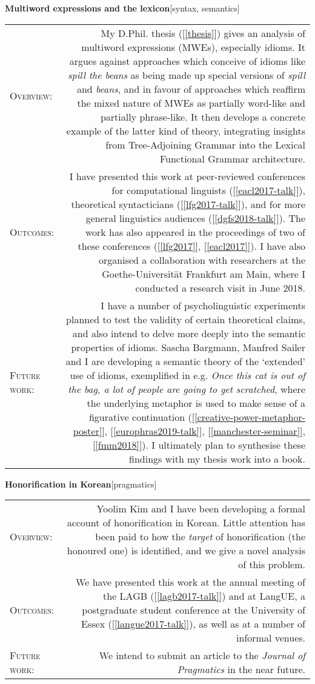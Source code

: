 \documentclass[11pt,a4paper]{article}
\makeatletter
\newlength{\rulelength}%
\newcommand{\REx}[2]{%
\vspace*{0.1\baselineskip}%
{\large\textbf{#1}\hfill\textnormal{[#2]}}%
\vspace*{0.5\baselineskip}%
}
\newenvironment{cvsection}{%
  \setlength{\extrarowheight}{0.70ex}
  \begin{longtable}[l]{@{} L R @{}}
}{%
  \end{longtable}
}
\newcommand{\sref}[1]{[\ref{#1}]}
\newcommand{\subhead}[1]{%
\textsc{#1}:%
}
\makeatother
\begin{document}
\REx{Multiword expressions and the lexicon}{syntax, semantics}
\begin{cvsection}
  \subhead{Overview} &%
  My D.Phil. thesis (\sref{thesis}) gives an analysis of multiword expressions (MWEs), especially idioms. It argues against approaches which conceive of idioms like \emph{spill the beans} as being made up special versions of \emph{spill} and \emph{beans}, and in favour of approaches which reaffirm the mixed nature of MWEs as partially word-like and partially phrase-like. It then develops a concrete example of the latter kind of theory, integrating insights from Tree-Adjoining Grammar into the Lexical Functional Grammar architecture.%
\\
  \subhead{Outcomes} &%
  I have presented this work at peer-reviewed conferences for computational linguists (\sref{eacl2017-talk}), theoretical syntacticians (\sref{lfg2017-talk}), and for more general linguistics audiences (\sref{dgfs2018-talk}). The work has also appeared in the proceedings of two of these conferences (\sref{lfg2017}, \sref{eacl2017}).
  I have also organised a collaboration with researchers at the Goethe-Universit\"{a}t Frankfurt am Main, where I conducted a research visit in June 2018.
\\
  \subhead{Future work} &%
  I have a number of psycholinguistic experiments planned to test the validity of certain theoretical claims, and also intend to delve more deeply into the semantic properties of idioms. Sascha Bargmann, Manfred Sailer and I are developing a semantic theory of the `extended' use of idioms, exemplified in e.g. \textit{Once this cat is out of the bag, a lot of people are going to get scratched}, where the underlying metaphor is used to make sense of a figurative continuation (\sref{creative-power-metaphor-poster}, \sref{europhras2019-talk}, \sref{manchester-seminar}, \sref{fmm2018}). I ultimately plan to synthesise these findings with my thesis work into a book.
\end{cvsection}

\REx{Honorification in Korean}{pragmatics}
\begin{cvsection}
  \subhead{Overview} &%
  Yoolim Kim and I have been developing a formal account of honorification in Korean. Little attention has been paid to how the \emph{target} of honorification (the honoured one) is identified, and we give a novel analysis of this problem.%
\\
  \subhead{Outcomes} &%
  We have presented this work at the annual meeting of the LAGB (\sref{lagb2017-talk}) and at LangUE, a postgraduate student conference at the University of Essex (\sref{langue2017-talk}), as well as at a number of informal venues.%
\\
  \subhead{Future work} &%
  We intend to submit an article to the \textit{Journal of Pragmatics} in the near future.
\end{cvsection}
\end{document}
